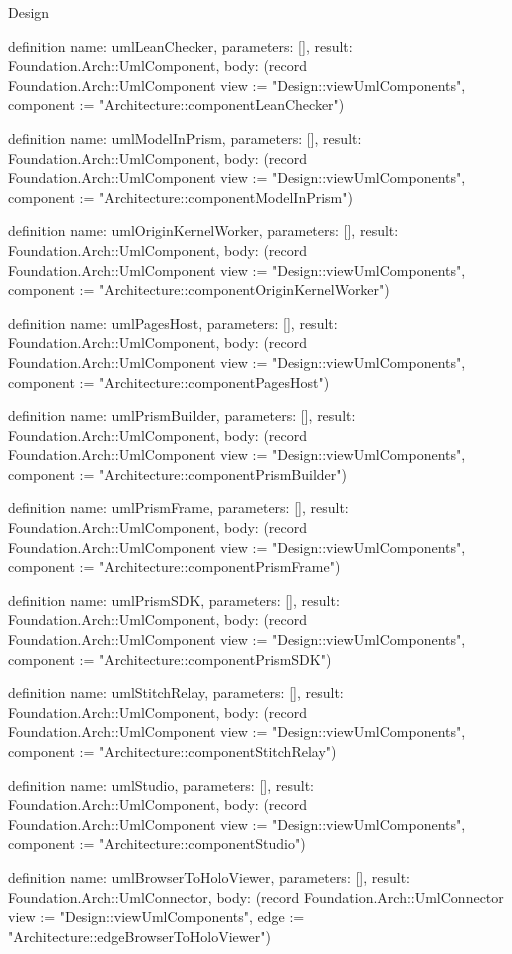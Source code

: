 \begin{lexlean}{Design}
\begin{semanticmodule}
definition{
  name: umlLeanChecker,
  parameters: [],
  result: Foundation.Arch::UmlComponent,
  body: (record Foundation.Arch::UmlComponent {view := "Design::viewUmlComponents", component := "Architecture::componentLeanChecker"})
}

definition{
  name: umlModelInPrism,
  parameters: [],
  result: Foundation.Arch::UmlComponent,
  body: (record Foundation.Arch::UmlComponent {view := "Design::viewUmlComponents", component := "Architecture::componentModelInPrism"})
}

definition{
  name: umlOriginKernelWorker,
  parameters: [],
  result: Foundation.Arch::UmlComponent,
  body: (record Foundation.Arch::UmlComponent {view := "Design::viewUmlComponents", component := "Architecture::componentOriginKernelWorker"})
}

definition{
  name: umlPagesHost,
  parameters: [],
  result: Foundation.Arch::UmlComponent,
  body: (record Foundation.Arch::UmlComponent {view := "Design::viewUmlComponents", component := "Architecture::componentPagesHost"})
}

definition{
  name: umlPrismBuilder,
  parameters: [],
  result: Foundation.Arch::UmlComponent,
  body: (record Foundation.Arch::UmlComponent {view := "Design::viewUmlComponents", component := "Architecture::componentPrismBuilder"})
}

definition{
  name: umlPrismFrame,
  parameters: [],
  result: Foundation.Arch::UmlComponent,
  body: (record Foundation.Arch::UmlComponent {view := "Design::viewUmlComponents", component := "Architecture::componentPrismFrame"})
}

definition{
  name: umlPrismSDK,
  parameters: [],
  result: Foundation.Arch::UmlComponent,
  body: (record Foundation.Arch::UmlComponent {view := "Design::viewUmlComponents", component := "Architecture::componentPrismSDK"})
}

definition{
  name: umlStitchRelay,
  parameters: [],
  result: Foundation.Arch::UmlComponent,
  body: (record Foundation.Arch::UmlComponent {view := "Design::viewUmlComponents", component := "Architecture::componentStitchRelay"})
}

definition{
  name: umlStudio,
  parameters: [],
  result: Foundation.Arch::UmlComponent,
  body: (record Foundation.Arch::UmlComponent {view := "Design::viewUmlComponents", component := "Architecture::componentStudio"})
}

definition{
  name: umlBrowserToHoloViewer,
  parameters: [],
  result: Foundation.Arch::UmlConnector,
  body: (record Foundation.Arch::UmlConnector {view := "Design::viewUmlComponents", edge := "Architecture::edgeBrowserToHoloViewer"})
}


\end{semanticmodule}
\end{lexlean}
